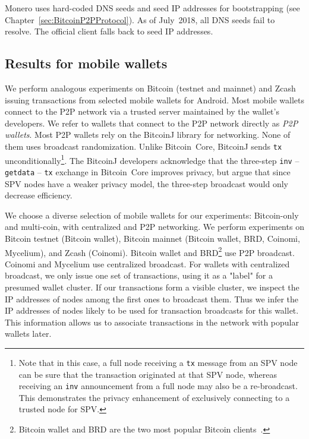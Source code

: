 Monero uses hard-coded DNS seeds and seed IP addresses for bootstrapping (see Chapter~\ref{sec:BitcoinP2PProtocol}).
As of July~2018, all DNS seeds fail to resolve.
The official client falls back to seed IP addresses.


\subsection{Results for mobile wallets}

We perform analogous experiments on Bitcoin (testnet and mainnet) and Zcash issuing transactions from selected mobile wallets for Android.
Most mobile wallets connect to the P2P network via a trusted server maintained by the wallet's developers.
We refer to wallets that connect to the P2P network directly as \textit{P2P wallets}.
Most P2P wallets rely on the BitcoinJ library for networking.
None of them uses broadcast randomization.
Unlike Bitcoin~Core, BitcoinJ sends \texttt{tx} unconditionally\footnote{Note that in this case, a full node receiving a \texttt{tx} message from an SPV node can be sure that the transaction originated at that SPV node, whereas receiving an \texttt{inv} announcement from a full node may also be a re-broadcast. This demonstrates the privacy enhancement of exclusively connecting to a trusted node for SPV.}.
The BitcoinJ developers acknowledge that the three-step \texttt{inv} -- \texttt{getdata} -- \texttt{tx} exchange in Bitcoin~Core improves privacy, but argue that since SPV nodes have a weaker privacy model, the three-step broadcast would only decrease efficiency.

We choose a diverse selection of mobile wallets for our experiments: Bitcoin-only and multi-coin, with centralized and P2P networking.
We perform experiments on Bitcoin testnet (Bitcoin wallet), Bitcoin mainnet (Bitcoin wallet, BRD, Coinomi, Mycelium), and Zcash (Coinomi).
Bitcoin wallet and BRD\footnote{Bitcoin wallet and BRD are the two most popular Bitcoin clients~\cite{Wang2017}.} use P2P broadcast.
Coinomi and Mycelium use centralized broadcast.
For wallets with centralized broadcast, we only issue one set of transactions, using it as a "label" for a presumed wallet cluster.
If our transactions form a visible cluster, we inspect the IP addresses of nodes among the first ones to broadcast them.
Thus we infer the IP addresses of nodes likely to be used for transaction broadcasts for this wallet.
This information allows us to associate transactions in the network with popular wallets later.

